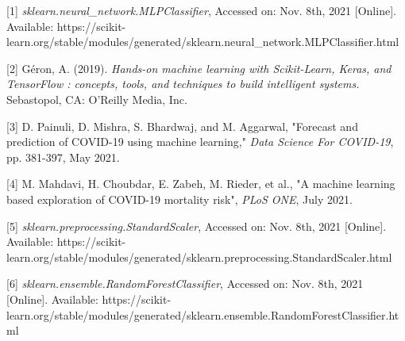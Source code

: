 \documentclass[conference]{IEEEtran}
\begin{document}
[1] \emph{sklearn.neural\_network.MLPClassifier}, Accessed on: Nov. 8th, 2021 [Online]. Available: https://scikit-learn.org/stable/modules/generated/sklearn.neural\_network.MLPClassifier.html 

[2] Géron, A. (2019). \emph{Hands-on machine learning with Scikit-Learn, Keras, and TensorFlow : concepts, tools, and techniques to build intelligent systems.} Sebastopol, CA: O'Reilly Media, Inc.

[3] D. Painuli, D. Mishra, S. Bhardwaj, and M. Aggarwal, "Forecast and prediction of COVID-19 using machine learning," \emph{Data Science For COVID-19}, pp. 381-397, May 2021. 

[4] M. Mahdavi, H. Choubdar, E. Zabeh, M. Rieder, et al., "A machine learning based exploration of COVID-19 mortality risk", \emph{PLoS ONE}, July 2021. 

[5] \emph{sklearn.preprocessing.StandardScaler}, Accessed on: Nov. 8th, 2021 [Online]. Available: https://scikit-learn.org/stable/modules/generated/sklearn.preprocessing.StandardScaler.html

[6] \emph{sklearn.ensemble.RandomForestClassifier}, Accessed on: Nov. 8th, 2021 [Online]. Available: https://scikit-learn.org/stable/modules/generated/sklearn.ensemble.RandomForestClassifier.html 
\end{document}
